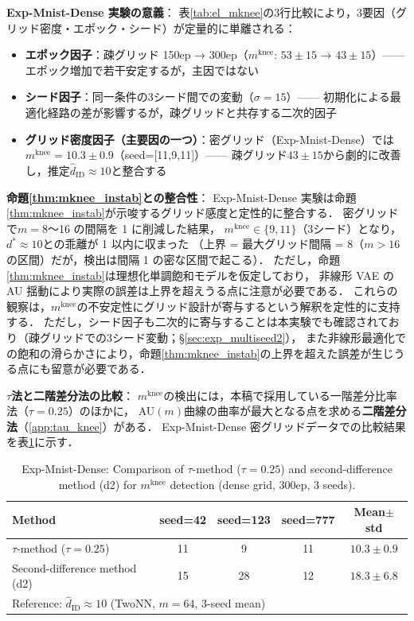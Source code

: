 \documentclass[11pt,a4paper]{jsarticle}
\newcommand{\mknee}{m^{\mathrm{knee}}}
\begin{document}
\textbf{Exp-Mnist-Dense 実験の意義}：
表\ref{tab:el_mknee}の3行比較により，3要因（グリッド密度・エポック・シード）が定量的に単離される：
\begin{itemize}
  \item \textbf{エポック因子}：疎グリッド 150ep → 300ep（$\mknee$: $53\pm15$ → $43\pm15$）—— エポック増加で若干安定するが，主因ではない
  \item \textbf{シード因子}：同一条件の3シード間での変動（$\sigma = 15$）—— 初期化による最適化経路の差が影響するが，疎グリッドと共存する二次的因子
  \item \textbf{グリッド密度因子（主要因の一つ）}：密グリッド（Exp-Mnist-Dense）では$\mknee = 10.3 \pm 0.9$（seed=[11,9,11]）—— 疎グリッド$43\pm15$から劇的に改善し，推定$\hat{d}_\mathrm{ID} \approx 10$と整合する
\end{itemize}

\noindent
\textbf{命題\ref{thm:mknee_instab}との整合性}：
Exp-Mnist-Dense 実験は命題\ref{thm:mknee_instab}が示唆するグリッド感度と定性的に整合する．
密グリッドで$m = 8$〜16 の間隔を 1 に削減した結果，
$\mknee \in \{9, 11\}$（3シード）となり，$d^* \approx 10$との乖離が 1 以内に収まった
（上界 = 最大グリッド間隔 = 8（$m > 16$の区間）だが，検出は間隔 1 の密な区間で起こる）．
ただし，命題\ref{thm:mknee_instab}は理想化単調飽和モデルを仮定しており，
非線形 VAE の AU 揺動により実際の誤差は上界を超えうる点に注意が必要である．
これらの観察は，$\mknee$の不安定性にグリッド設計が寄与するという解釈を定性的に支持する．
ただし，シード因子も二次的に寄与することは本実験でも確認されており（疎グリッドでの3シード変動；§\ref{sec:exp_multiseed2}），
また非線形最適化での飽和の滑らかさにより，命題\ref{thm:mknee_instab}の上界を超えた誤差が生じうる点にも留意が必要である．

\noindent
\textbf{$\tau$法と二階差分法の比較}：
$\mknee$の検出には，本稿で採用している一階差分比率法（$\tau = 0.25$）のほかに，
AU$(m)$曲線の曲率が最大となる点を求める\textbf{二階差分法}（\ref{app:tau_knee}）がある．
Exp-Mnist-Dense 密グリッドデータでの比較結果を表\ref{tab:el_knee_compare}に示す．

\begin{table}[H]
\centering
\caption{Exp-Mnist-Dense: Comparison of $\tau$-method ($\tau=0.25$) and second-difference method (d2) for $\mknee$ detection (dense grid, 300ep, 3 seeds).}
\label{tab:el_knee_compare}
\small
\begin{tabular}{lcccc}
\toprule
Method & seed=42 & seed=123 & seed=777 & Mean$\pm$std \\
\midrule
$\tau$-method ($\tau=0.25$) & 11 & 9  & 11 & $10.3 \pm 0.9$ \\
Second-difference method (d2) & 15 & 28 & 12 & $18.3 \pm 6.8$ \\
\midrule
\multicolumn{5}{l}{Reference: $\hat{d}_\mathrm{ID} \approx 10$ (TwoNN, $m=64$, 3-seed mean)} \\
\bottomrule
\end{tabular}
\end{table}
\end{document}
